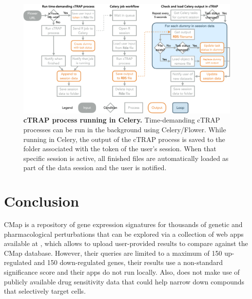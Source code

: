 \begin{figure}[!htb]
  \includegraphics[width=\textwidth]{images/ctrap/celery-job}
  \centering
  \caption[cTRAP process running in Celery]{\textbf{cTRAP process running in Celery.} Time-demanding cTRAP processes can be run in the background using Celery/Flower. While running in Celery, the output of the cTRAP process is saved to the folder associated with the token of the user's session. When that specific session is active, all finished files are automatically loaded as part of the data session and the user is notified.}
  \label{fig:ctrap-celery}
\end{figure}

\section{Conclusion}


CMap is a repository of gene expression signatures for thousands of genetic and pharmacological perturbations that can be explored via a collection of web apps available at , which allows to upload user-provided results to compare against the CMap database. However, their queries are limited to a maximum of 150 up-regulated and 150 down-regulated genes, their results use a non-standard significance score and their apps do not run locally. Also,  does not make use of publicly available drug sensitivity data that could help narrow down compounds that selectively target cells.

